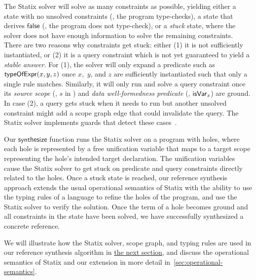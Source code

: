 The Statix solver will solve as many constraints as possible, yielding either a state with no unsolved constraints (\ie, the program type-checks), a state that derives $\mathsf{false}$ (\ie, the program does not type-check), or a \emph{stuck} state, where the solver does not have enough information to solve the remaining constraints.
There are two reasons why constraints get stuck:
either (1) it is not sufficiently instantiated,
or (2) it is a query constraint which is not yet guaranteed to yield a \emph{stable answer}.
For (1), the solver will only expand a predicate such as $\mathsf{typeOfExpr}(x, y, z)$ once $x$,~$y$, and $z$ are sufficiently instantiated such that only a single rule matches.
Similarly, it will only run and solve a query constraint once its \emph{source scope} (\eg, $s$ in ) and \emph{data well-formedness predicate} (\eg, $\mathsf{isVar}_{\mathit{x}}$) are ground.
In case (2), a query gets stuck when it needs to run but another unsolved constraint might add a scope graph edge that could invalidate the query.
The Statix solver implements guards that detect these cases~\citep{RouvoetAPKV20}.

Our $\mathsf{synthesize}$ function runs the Statix solver on a program with holes, where each hole is represented by a free unification variable that maps to a target scope representing the hole's intended target declaration.
The unification variables cause the Statix solver to get stuck on predicate and query constraints directly related to the holes.
Once a stuck state is reached, our reference synthesis approach extends the usual operational semantics of Statix with the ability to use the typing rules of a language to refine the holes of the program, and use the Statix solver to verify the solution.
Once the term of a hole becomes ground and all constraints in the state have been solved, we have successfully synthesized a concrete reference.

We will illustrate how the Statix solver, scope graph, and typing rules are used in our reference synthesis algorithm in \hyperref[sec:reference-synthesis-by-example]{the next section}, and discuss the operational semantics of Statix and our extension in more detail in~\cref{sec:operational-semantics}.


